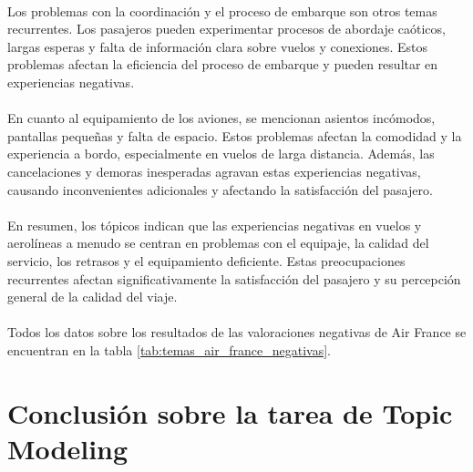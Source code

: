 \documentclass{report}
\begin{document}
{                    \paragraph*{}{
                        Los problemas con la coordinación y el proceso de embarque son otros temas recurrentes. Los pasajeros pueden experimentar procesos de abordaje caóticos, largas esperas y falta de información clara sobre vuelos y conexiones. Estos problemas afectan la eficiencia del proceso de embarque y pueden resultar en experiencias negativas.
                    }
                    \paragraph*{}{
                        En cuanto al equipamiento de los aviones, se mencionan asientos incómodos, pantallas pequeñas y falta de espacio. Estos problemas afectan la comodidad y la experiencia a bordo, especialmente en vuelos de larga distancia. Además, las cancelaciones y demoras inesperadas agravan estas experiencias negativas, causando inconvenientes adicionales y afectando la satisfacción del pasajero.
                    }
                    \paragraph*{}{
                        En resumen, los tópicos indican que las experiencias negativas en vuelos y aerolíneas a menudo se centran en problemas con el equipaje, la calidad del servicio, los retrasos y el equipamiento deficiente. Estas preocupaciones recurrentes afectan significativamente la satisfacción del pasajero y su percepción general de la calidad del viaje.
                    }
                    \paragraph*{}{
                        Todos los datos sobre los resultados de las valoraciones negativas de Air France se encuentran en la tabla \ref{tab:temas_air_france_negativas}.
                    }
        \clearpage\section{Conclusión sobre la tarea de Topic Modeling}
}
\end{document}
